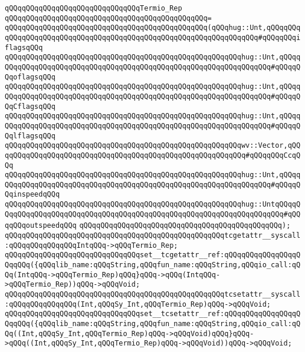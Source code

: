 \newline
\verb|qQQqqQQqqQQqqQQqqQQqqQQqqQQqqQQqTermio_Rep|\newline
\verb|qQQqqQQqqQQqqQQqqQQqqQQqqQQqqQQqqQQqqQQqqQQqqQQq=|\newline
\verb|qQQqqQQqqQQqqQQqqQQqqQQqqQQqqQQqqQQqqQQqqQQqqQQq(qQQqhug::Unt,qQQqqQQqqQQqqQQqqQQqqQQqqQQqqQQqqQQqqQQqqQQqqQQqqQQqqQQqqQQqqQQqqQQq#qQQqqQQqiflagsqQQq|\newline
\verb|qQQqqQQqqQQqqQQqqQQqqQQqqQQqqQQqqQQqqQQqqQQqqQQqqQQqqQQqhug::Unt,qQQqqQQqqQQqqQQqqQQqqQQqqQQqqQQqqQQqqQQqqQQqqQQqqQQqqQQqqQQqqQQqqQQq#qQQqqQQqoflagsqQQq|\newline
\verb|qQQqqQQqqQQqqQQqqQQqqQQqqQQqqQQqqQQqqQQqqQQqqQQqqQQqqQQqhug::Unt,qQQqqQQqqQQqqQQqqQQqqQQqqQQqqQQqqQQqqQQqqQQqqQQqqQQqqQQqqQQqqQQqqQQq#qQQqqQQqCflagsqQQq|\newline
\verb|qQQqqQQqqQQqqQQqqQQqqQQqqQQqqQQqqQQqqQQqqQQqqQQqqQQqqQQqhug::Unt,qQQqqQQqqQQqqQQqqQQqqQQqqQQqqQQqqQQqqQQqqQQqqQQqqQQqqQQqqQQqqQQqqQQq#qQQqqQQqlflagsqQQq|\newline
\verb|qQQqqQQqqQQqqQQqqQQqqQQqqQQqqQQqqQQqqQQqqQQqqQQqqQQqqQQqwv::Vector,qQQqqQQqqQQqqQQqqQQqqQQqqQQqqQQqqQQqqQQqqQQqqQQqqQQqqQQqqQQq#qQQqqQQqCcqQQq|\newline
\verb|qQQqqQQqqQQqqQQqqQQqqQQqqQQqqQQqqQQqqQQqqQQqqQQqqQQqqQQqhug::Unt,qQQqqQQqqQQqqQQqqQQqqQQqqQQqqQQqqQQqqQQqqQQqqQQqqQQqqQQqqQQqqQQqqQQq#qQQqqQQqinspeedqQQq|\newline
\verb|qQQqqQQqqQQqqQQqqQQqqQQqqQQqqQQqqQQqqQQqqQQqqQQqqQQqqQQqhug::UntqQQqqQQqqQQqqQQqqQQqqQQqqQQqqQQqqQQqqQQqqQQqqQQqqQQqqQQqqQQqqQQqqQQqqQQq#qQQqqQQqoutspeedqQQq|\newline
\verb|qQQqqQQqqQQqqQQqqQQqqQQqqQQqqQQqqQQqqQQqqQQqqQQq);|\newline
\newline
\verb|qQQqqQQqqQQqqQQqqQQqqQQqqQQqqQQqqQQqqQQqqQQqqQQqqQQqtcgetattr__syscall:qQQqqQQqqQQqqQQqIntqQQq->qQQqTermio_Rep;|\newline
\verb|qQQqqQQqqQQqqQQqqQQqqQQqqQQqqQQqset__tcgetattr__ref:qQQqqQQqqQQqqQQqqQQqqQQq({qQQqlib_name:qQQqString,qQQqfun_name:qQQqString,qQQqio_call:qQQq(IntqQQq->qQQqTermio_Rep)qQQq}qQQq->qQQq(IntqQQq->qQQqTermio_Rep))qQQq->qQQqVoid;|\newline
\newline
\verb|qQQqqQQqqQQqqQQqqQQqqQQqqQQqqQQqqQQqqQQqqQQqqQQqqQQqtcsetattr__syscall:qQQqqQQqqQQqqQQq(Int,qQQqSy_Int,qQQqTermio_Rep)qQQq->qQQqVoid;|\newline
\verb|qQQqqQQqqQQqqQQqqQQqqQQqqQQqqQQqset__tcsetattr__ref:qQQqqQQqqQQqqQQqqQQqqQQq({qQQqlib_name:qQQqString,qQQqfun_name:qQQqString,qQQqio_call:qQQq((Int,qQQqSy_Int,qQQqTermio_Rep)qQQq->qQQqVoid)qQQq}qQQq->qQQq((Int,qQQqSy_Int,qQQqTermio_Rep)qQQq->qQQqVoid))qQQq->qQQqVoid;|\newline
